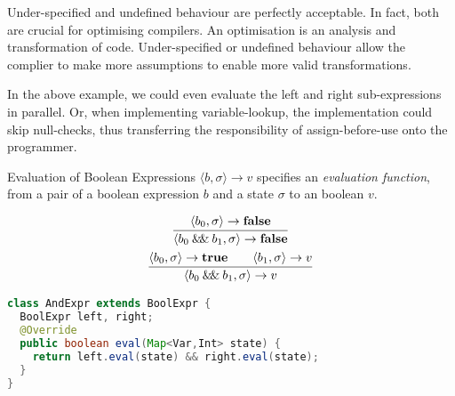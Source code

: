 Under-specified and undefined behaviour are perfectly acceptable. In fact,
both are crucial for optimising compilers. An optimisation is an analysis and
transformation of code.  Under-specified or undefined behaviour allow the
complier to make more assumptions to enable more valid transformations.

In the above example, we could even evaluate the left and right
sub-expressions in parallel. Or, when implementing variable-lookup, the
implementation could skip null-checks, thus transferring the responsibility
of assign-before-use onto the programmer.

\begin{frame}[fragile]{Evaluation of Boolean Expressions}
    $\langle b, \sigma \rangle \rightarrow v$ specifies an \emph{evaluation
    function}, from a pair of a boolean expression $b$ and a state $\sigma$
    to an boolean $v$.
    \begin{overprint}
        \begin{gather*}
            \infer{\langle b_0 \doubleAmp b_1 , \sigma \rangle \rightarrow \mathbf{false}}{\langle b_0 , \sigma \rangle \rightarrow \mathbf{false}} \\
            \infer{\langle b_0 \doubleAmp b_1 , \sigma \rangle \rightarrow v}{\langle b_0 , \sigma \rangle \rightarrow \mathbf{true} \qquad \langle b_1 , \sigma \rangle \rightarrow v}
        \end{gather*}
        \begin{lstlisting}[language=java, basicstyle=\small]
class AndExpr extends BoolExpr {
  BoolExpr left, right;
  @Override
  public boolean eval(Map<Var,Int> state) {
    return left.eval(state) && right.eval(state);
  }
}
        \end{lstlisting}
    \end{overprint}
\end{frame}

